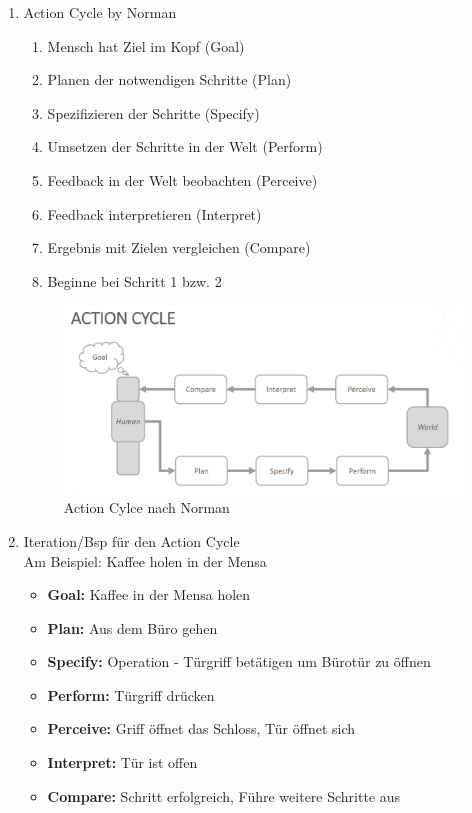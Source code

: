 \begin{enumerate}
	\item Action Cycle by Norman
	\begin{enumerate}
		\item Mensch hat Ziel im Kopf (Goal)
		\item Planen der notwendigen Schritte (Plan)
		\item Spezifizieren der Schritte (Specify) 
		\item Umsetzen der Schritte in der Welt (Perform)
		\item Feedback in der Welt beobachten (Perceive) 
		\item Feedback interpretieren (Interpret)
		\item Ergebnis mit Zielen vergleichen (Compare)
		\item Beginne bei Schritt 1 bzw. 2
	\end{enumerate}
	\begin{figure}[!h]
		\centering
		\includegraphics[scale=0.4]{img/action_cycle.png}
		\caption{Action Cylce nach Norman}
	\end{figure}
	
	\item Iteration/Bsp für den Action Cycle\\
	Am Beispiel: Kaffee holen in der Mensa
	\begin{itemize}
		\item \textbf{Goal:} Kaffee in der Mensa holen
		\item \textbf{Plan:} Aus dem Büro gehen
		\item \textbf{Specify:} Operation - Türgriff betätigen um Bürotür zu öffnen
		\item \textbf{Perform:} Türgriff drücken
		\item \textbf{Perceive:} Griff öffnet das Schloss, Tür öffnet sich
		\item \textbf{Interpret:} Tür ist offen
		\item \textbf{Compare:} Schritt erfolgreich, Führe weitere Schritte aus
	\end{itemize}
	

\end{enumerate}
